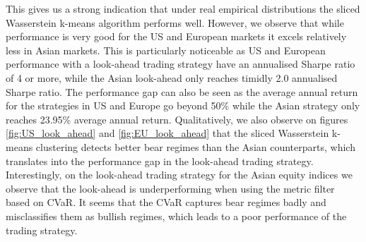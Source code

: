 \documentclass[12pt,a4paper]{report}
\begin{document}
This gives us a strong indication that under real empirical distributions the sliced Wasserstein k-means algorithm performs well. 
However, we observe that while performance is very good for the US and European markets it excels relatively less in Asian markets.
This is particularly noticeable as US and European performance with a look-ahead trading strategy have an annualised Sharpe ratio of 4 or more, while the Asian look-ahead only reaches timidly 2.0 annualised Sharpe ratio. 
The performance gap can also be seen as the average annual return for the strategies in US and Europe go beyond 50\% while the Asian strategy only reaches 23.95\% average annual return.
Qualitatively, we also observe on figures \ref{fig:US_look_ahead} and \ref{fig:EU_look_ahead} that the sliced Wasserstein k-means clustering detects better bear regimes than the Asian counterparts, which translates 
into the performance gap in the look-ahead trading strategy.
Interestingly, on the look-ahead trading strategy for the Asian equity indices we observe that the look-ahead is underperforming when using the metric filter based on CVaR. It seems that the CVaR captures bear regimes badly
and misclassifies them as bullish regimes, which leads to a poor performance of the trading strategy.
\end{document}
